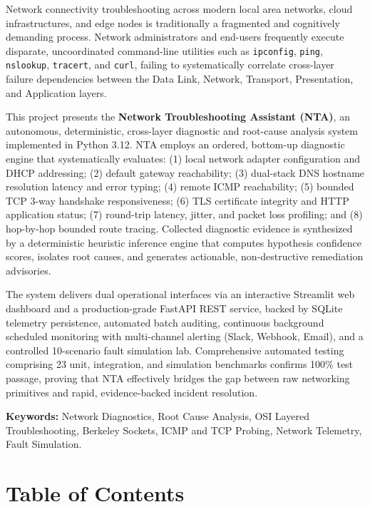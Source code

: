 \documentclass[
]{article}
\begin{document}
Network connectivity troubleshooting across modern local area networks, cloud infrastructures, and edge nodes is traditionally a fragmented and cognitively demanding process. Network administrators and end-users frequently execute disparate, uncoordinated command-line utilities such as \texttt{ipconfig}, \texttt{ping}, \texttt{nslookup}, \texttt{tracert}, and \texttt{curl}, failing to systematically correlate cross-layer failure dependencies between the Data Link, Network, Transport, Presentation, and Application layers. 

This project presents the \textbf{Network Troubleshooting Assistant (NTA)}, an autonomous, deterministic, cross-layer diagnostic and root-cause analysis system implemented in Python 3.12. NTA employs an ordered, bottom-up diagnostic engine that systematically evaluates: (1) local network adapter configuration and DHCP addressing; (2) default gateway reachability; (3) dual-stack DNS hostname resolution latency and error typing; (4) remote ICMP reachability; (5) bounded TCP 3-way handshake responsiveness; (6) TLS certificate integrity and HTTP application status; (7) round-trip latency, jitter, and packet loss profiling; and (8) hop-by-hop bounded route tracing. Collected diagnostic evidence is synthesized by a deterministic heuristic inference engine that computes hypothesis confidence scores, isolates root causes, and generates actionable, non-destructive remediation advisories. 

The system delivers dual operational interfaces via an interactive Streamlit web dashboard and a production-grade FastAPI REST service, backed by SQLite telemetry persistence, automated batch auditing, continuous background scheduled monitoring with multi-channel alerting (Slack, Webhook, Email), and a controlled 10-scenario fault simulation lab. Comprehensive automated testing comprising 23 unit, integration, and simulation benchmarks confirms 100\% test passage, proving that NTA effectively bridges the gap between raw networking primitives and rapid, evidence-backed incident resolution.

\vspace{0.3cm}
\textbf{Keywords:} Network Diagnostics, Root Cause Analysis, OSI Layered Troubleshooting, Berkeley Sockets, ICMP and TCP Probing, Network Telemetry, Fault Simulation.

\newpage

\section{Table of Contents}\label{table-of-contents}
\end{document}
